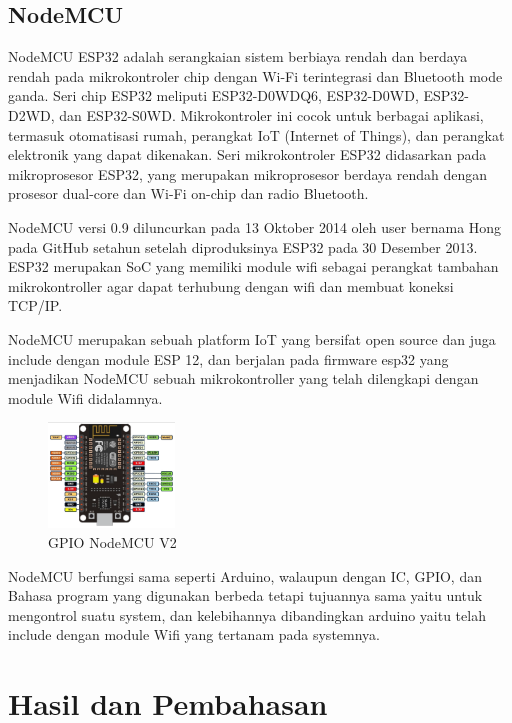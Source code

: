 \documentclass[conference]{IEEEtran}
\begin{document}
    \subsection{NodeMCU}
    NodeMCU ESP32 adalah serangkaian sistem berbiaya rendah dan berdaya rendah pada mikrokontroler chip dengan Wi-Fi terintegrasi dan Bluetooth mode ganda. Seri chip ESP32 meliputi ESP32-D0WDQ6, ESP32-D0WD, ESP32-D2WD, dan ESP32-S0WD. Mikrokontroler ini cocok untuk berbagai aplikasi, termasuk otomatisasi rumah, perangkat IoT (Internet of Things), dan perangkat elektronik yang dapat dikenakan. Seri mikrokontroler ESP32 didasarkan pada mikroprosesor ESP32, yang merupakan mikroprosesor berdaya rendah dengan prosesor dual-core dan Wi-Fi on-chip dan radio Bluetooth.

    NodeMCU versi 0.9 diluncurkan pada 13 Oktober 2014 oleh user bernama Hong pada GitHub setahun setelah diproduksinya ESP32 pada 30 Desember 2013. ESP32 merupakan SoC yang memiliki module wifi sebagai perangkat tambahan mikrokontroller agar dapat terhubung dengan wifi dan membuat koneksi TCP/IP.

    NodeMCU merupakan sebuah platform IoT yang bersifat open source dan juga include dengan module ESP 12, dan berjalan pada firmware esp32 yang menjadikan NodeMCU sebuah mikrokontroller yang telah dilengkapi dengan module Wifi didalamnya.

    \begin{figure}[h]
        \centering
        \includegraphics[width=0.3\textwidth]{Nodem.png}
        \caption{GPIO NodeMCU V2}
    \end{figure}

    NodeMCU berfungsi sama seperti Arduino, walaupun dengan IC, GPIO, dan Bahasa program yang digunakan berbeda tetapi tujuannya sama yaitu untuk mengontrol suatu system, dan kelebihannya dibandingkan arduino yaitu telah include dengan module Wifi yang tertanam pada systemnya.

    
    
\section{Hasil dan Pembahasan}
\end{document}
